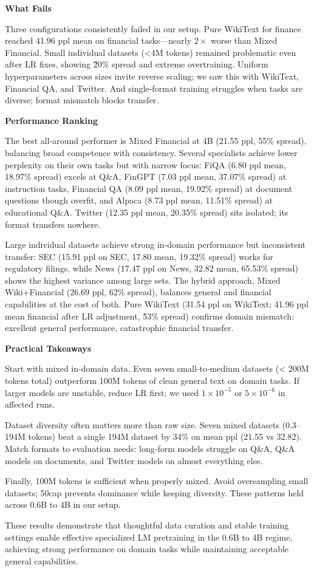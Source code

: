 \textbf{What Fails}

Three configurations consistently failed in our setup. Pure WikiText for finance reached 41.96 ppl mean on financial tasks—nearly $2\times$ worse than Mixed Financial. Small individual datasets (<4M tokens) remained problematic even after LR fixes, showing \~20\% spread and extreme overtraining. Uniform hyperparameters across sizes invite reverse scaling; we saw this with WikiText, Financial QA, and Twitter. And single‑format training struggles when tasks are diverse; format mismatch blocks transfer.

\textbf{Performance Ranking}

The best all‑around performer is Mixed Financial at 4B (21.55 ppl, 55\% spread), balancing broad competence with consistency. Several specialists achieve lower perplexity on their own tasks but with narrow focus: FiQA (6.80 ppl mean, 18.97\% spread) excels at Q\&A, FinGPT (7.03 ppl mean, 37.07\% spread) at instruction tasks, Financial QA (8.09 ppl mean, 19.92\% spread) at document questions though overfit, and Alpaca (8.73 ppl mean, 11.51\% spread) at educational Q\&A. Twitter (12.35 ppl mean, 20.35\% spread) sits isolated; its format transfers nowhere.

Large individual datasets achieve strong in‑domain performance but inconsistent transfer: SEC (15.91 ppl on SEC, 17.80 mean, 19.32\% spread) works for regulatory filings, while News (17.47 ppl on News, 32.82 mean, 65.53\% spread) shows the highest variance among large sets. The hybrid approach, Mixed Wiki+Financial (26.69 ppl, 62\% spread), balances general and financial capabilities at the cost of both. Pure WikiText (31.54 ppl on WikiText; 41.96 ppl mean financial after LR adjustment, \~53\% spread) confirms domain mismatch: excellent general performance, catastrophic financial transfer.

\textbf{Practical Takeaways}

Start with mixed in‑domain data. Even seven small‑to‑medium datasets (< 200M tokens total) outperform 100M tokens of clean general text on domain tasks. If larger models are unstable, reduce LR first; we used $1\times10^{-5}$ or $5\times10^{-6}$ in affected runs.

Dataset diversity often matters more than raw size. Seven mixed datasets (0.3–194M tokens) beat a single 194M dataset by 34\% on mean ppl (21.55 vs 32.82). Match formats to evaluation needs: long‑form models struggle on Q\&A, Q\&A models on documents, and Twitter models on almost everything else.

Finally, 100M tokens is sufficient when properly mixed. Avoid oversampling small datasets; 50cap prevents dominance while keeping diversity. These patterns held across 0.6B to 4B in our setup.

These results demonstrate that thoughtful data curation and stable training settings enable effective specialized LM pretraining in the 0.6B to 4B regime, achieving strong performance on domain tasks while maintaining acceptable general capabilities.
